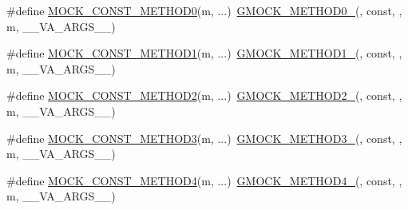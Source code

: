 \begin{DoxyCompactItemize}
\item 
\#define \mbox{\hyperlink{_obj__test_2lib_2googletest-master_2googlemock_2include_2gmock_2gmock-generated-function-mockers_8h_ac86e04e649fa8bf35b5f0149a13c935d}{M\+O\+C\+K\+\_\+\+C\+O\+N\+S\+T\+\_\+\+M\+E\+T\+H\+O\+D0}}(m, ...)~\mbox{\hyperlink{_obj__test_2lib_2googletest-release-1_88_81_2googlemock_2include_2gmock_2gmock-generated-function-mockers_8h_ae0d290ffa58d7c624b2e3487ba1252f4}{G\+M\+O\+C\+K\+\_\+\+M\+E\+T\+H\+O\+D0\+\_\+}}(, const, , m, \+\_\+\+\_\+\+V\+A\+\_\+\+A\+R\+G\+S\+\_\+\+\_\+)
\item 
\#define \mbox{\hyperlink{_obj__test_2lib_2googletest-master_2googlemock_2include_2gmock_2gmock-generated-function-mockers_8h_a6f76aeb56f492cfe538e177b6aa77965}{M\+O\+C\+K\+\_\+\+C\+O\+N\+S\+T\+\_\+\+M\+E\+T\+H\+O\+D1}}(m, ...)~\mbox{\hyperlink{_obj__test_2lib_2googletest-release-1_88_81_2googlemock_2include_2gmock_2gmock-generated-function-mockers_8h_a1bc0012d62440dda77208dabdf4925c9}{G\+M\+O\+C\+K\+\_\+\+M\+E\+T\+H\+O\+D1\+\_\+}}(, const, , m, \+\_\+\+\_\+\+V\+A\+\_\+\+A\+R\+G\+S\+\_\+\+\_\+)
\item 
\#define \mbox{\hyperlink{_obj__test_2lib_2googletest-master_2googlemock_2include_2gmock_2gmock-generated-function-mockers_8h_a31c489715704817a3f40d178404c61e8}{M\+O\+C\+K\+\_\+\+C\+O\+N\+S\+T\+\_\+\+M\+E\+T\+H\+O\+D2}}(m, ...)~\mbox{\hyperlink{_obj__test_2lib_2googletest-release-1_88_81_2googlemock_2include_2gmock_2gmock-generated-function-mockers_8h_a885295ca6bebb15efb3fc786218c5d47}{G\+M\+O\+C\+K\+\_\+\+M\+E\+T\+H\+O\+D2\+\_\+}}(, const, , m, \+\_\+\+\_\+\+V\+A\+\_\+\+A\+R\+G\+S\+\_\+\+\_\+)
\item 
\#define \mbox{\hyperlink{_obj__test_2lib_2googletest-master_2googlemock_2include_2gmock_2gmock-generated-function-mockers_8h_a9e67763df6705172e1a2ae92f1446bbc}{M\+O\+C\+K\+\_\+\+C\+O\+N\+S\+T\+\_\+\+M\+E\+T\+H\+O\+D3}}(m, ...)~\mbox{\hyperlink{_obj__test_2lib_2googletest-release-1_88_81_2googlemock_2include_2gmock_2gmock-generated-function-mockers_8h_af7c77ba511c631de02bb8c45a6ed3045}{G\+M\+O\+C\+K\+\_\+\+M\+E\+T\+H\+O\+D3\+\_\+}}(, const, , m, \+\_\+\+\_\+\+V\+A\+\_\+\+A\+R\+G\+S\+\_\+\+\_\+)
\item 
\#define \mbox{\hyperlink{_obj__test_2lib_2googletest-master_2googlemock_2include_2gmock_2gmock-generated-function-mockers_8h_a4614e9d6b24dff60c30dd4dedf494c6c}{M\+O\+C\+K\+\_\+\+C\+O\+N\+S\+T\+\_\+\+M\+E\+T\+H\+O\+D4}}(m, ...)~\mbox{\hyperlink{_obj__test_2lib_2googletest-release-1_88_81_2googlemock_2include_2gmock_2gmock-generated-function-mockers_8h_ab6430f2cfad9de4aca5258ea559294bb}{G\+M\+O\+C\+K\+\_\+\+M\+E\+T\+H\+O\+D4\+\_\+}}(, const, , m, \+\_\+\+\_\+\+V\+A\+\_\+\+A\+R\+G\+S\+\_\+\+\_\+)

\end{DoxyCompactItemize}

